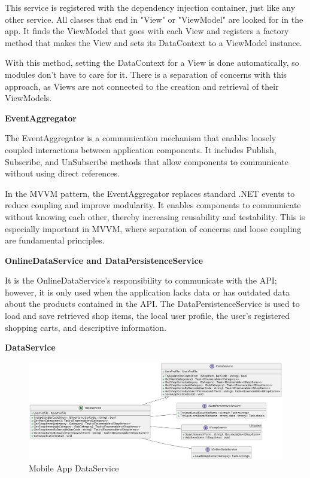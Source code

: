 This service is registered with the dependency injection container, just like any other service. All classes that end in "View" or "ViewModel" are looked for in the app. It finds the ViewModel that goes with each View and registers a factory method that makes the View and sets its DataContext to a ViewModel instance.

With this method, setting the DataContext for a View is done automatically, so modules don't have to care for it. There is a separation of concerns with this approach, as Views are not connected to the creation and retrieval of their ViewModels.

\noindent\textbf{EventAggregator}

The EventAggregator is a communication mechanism that enables loosely coupled interactions between application components. It includes Publish, Subscribe, and UnSubscribe methods that allow components to communicate without using direct references.

In the MVVM pattern, the EventAggregator replaces standard .NET events to reduce coupling and improve modularity. It enables components to communicate without knowing each other, thereby increasing reusability and testability. This is especially important in MVVM, where separation of concerns and loose coupling are fundamental principles.

\noindent\textbf{OnlineDataService and DataPersistenceService}

It is the OnlineDataService's responsibility to communicate with the API; however, it is only used when the application lacks data or has outdated data about the products contained in the API. The DataPersistenceService is used to load and save retrieved shop items, the local user profile, the user's registered shopping carts, and descriptive information.

\noindent\textbf{DataService}

\begin{figure}[H]
	\centering
	\includegraphics[width=1\linewidth]{img/app_dataservice.png}
	\caption{Mobile App DataService}
	\label{fig:appdataservice}
\end{figure}

